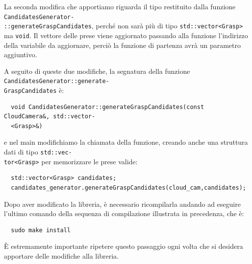 \documentclass{report}
\begin{document}
La seconda modifica che apportiamo riguarda il tipo restituito dalla funzione \texttt{CandidatesGenerator-}\\\texttt{::generateGraspCandidates}, perché non sarà più di tipo \texttt{std::vector<Grasp>} ma \texttt{void}. Il vettore delle prese viene aggiornato passando alla funzione l'indirizzo della variabile da aggiornare, perciò la funzione di partenza avrà un parametro aggiuntivo. \par 
A seguito di queste due modifiche, la segnatura della funzione \texttt{CandidatesGenerator::generate-}\\\texttt{GraspCandidates} è:
\begin{verbatim}
  void CandidatesGenerator::generateGraspCandidates(const CloudCamera&, std::vector-
  <Grasp>&)
\end{verbatim}
e nel main modifichiamo la chiamata della funzione, creando anche una struttura dati di tipo \texttt{std::vec-}\\\texttt{tor<Grasp>} per memorizzare le prese valide:
\begin{verbatim}
  std::vector<Grasp> candidates;
  candidates_generator.generateGraspCandidates(cloud_cam,candidates);
\end{verbatim}
Dopo aver modificato la libreria, è necessario ricompilarla andando ad eseguire l'ultimo comando della sequenza di compilazione illustrata in precedenza, che è: 
\begin{verbatim}
  sudo make install
\end{verbatim}
È estremamente importante ripetere questo passaggio ogni volta che si desidera apportare delle modifiche alla libreria.
\end{document}
